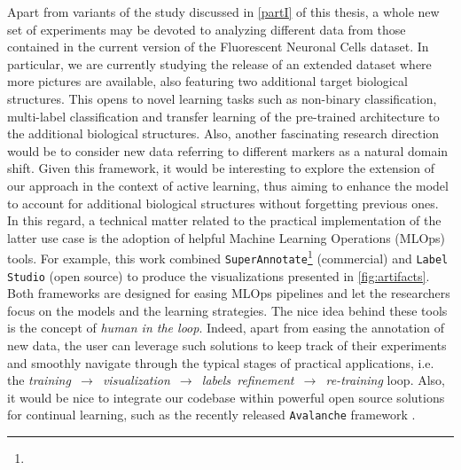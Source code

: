 Apart from variants of the study discussed in \cref{partI} of this thesis, a whole new set of experiments may be devoted to analyzing different data from those contained in the current version of the Fluorescent Neuronal Cells dataset.
In particular, we are currently studying the release of an extended dataset where more pictures are available, also featuring two additional target biological structures.
This opens to novel learning tasks such as non-binary classification, multi-label classification and transfer learning of the pre-trained architecture to the additional biological structures.
Also, another fascinating research direction would be to consider new data referring to different markers as a natural domain shift. Given this framework, it would be interesting to explore the extension of our approach in the context of active learning, thus aiming to enhance the model to account for additional biological structures without forgetting previous ones.
In this regard, a technical matter related to the practical implementation of the latter use case is the adoption of helpful Machine Learning Operations (MLOps) tools.
For example, this work combined \texttt{SuperAnnotate}\footnote{\superannotate} (commercial) and \texttt{Label Studio} (open source) \cite{labelstudio} to produce the visualizations presented in \cref{fig:artifacts}. Both frameworks are designed for easing MLOps pipelines and let the researchers focus on the models and the learning strategies.
The nice idea behind these tools is the concept of \textit{human in the loop}. 
Indeed, apart from easing the annotation of new data, the user can leverage such solutions to keep track of their experiments and smoothly navigate through the typical stages of practical applications, i.e. the \mbox{\textit{training $\longrightarrow$ visualization $\longrightarrow$ labels refinement $\longrightarrow$ re-training}} loop.
Also, it would be nice to integrate our codebase within powerful open source solutions for continual learning, such as the recently released \texttt{Avalanche} framework \cite{lomonaco2021avalanche}.

